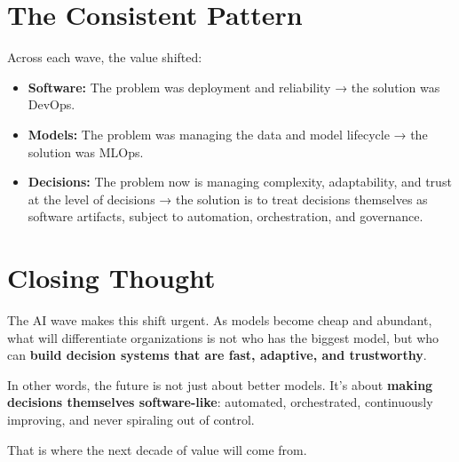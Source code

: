 \documentclass[
  letterpaper,
  DIV=11,
  numbers=noendperiod]{scrartcl}
\providecommand{\tightlist}{%
  \setlength{\itemsep}{0pt}\setlength{\parskip}{0pt}}
\begin{document}
\section{The Consistent Pattern}\label{the-consistent-pattern}

Across each wave, the value shifted:

\begin{itemize}
\tightlist
\item
  \textbf{Software:} The problem was deployment and reliability → the
  solution was DevOps.\\
\item
  \textbf{Models:} The problem was managing the data and model lifecycle
  → the solution was MLOps.\\
\item
  \textbf{Decisions:} The problem now is managing complexity,
  adaptability, and trust at the level of decisions → the solution is to
  treat decisions themselves as software artifacts, subject to
  automation, orchestration, and governance.
\end{itemize}

\section{Closing Thought}\label{closing-thought}

The AI wave makes this shift urgent. As models become cheap and
abundant, what will differentiate organizations is not who has the
biggest model, but who can \textbf{build decision systems that are fast,
adaptive, and trustworthy}.

In other words, the future is not just about better models. It's about
\textbf{making decisions themselves software-like}: automated,
orchestrated, continuously improving, and never spiraling out of
control.

That is where the next decade of value will come from.
\end{document}
